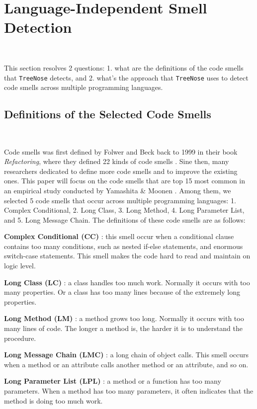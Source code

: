 \section{Language-Independent Smell Detection}~\label{sec:approach}

This section resolves 2 questions: 1. what are the definitions of the code
smells that \texttt{TreeNose} detects, and 2. what's the approach that
\texttt{TreeNose} uses to detect code smells across multiple programming
languages.

\subsection{Definitions of the Selected Code Smells}~\label{sec:definitions}

Code smells was first defined by Folwer and Beck back to 1999 in their book \textit{Refactoring},
where they defined 22 kinds of code smells \cite{Fowler_Beck}. Sine then, many researchers dedicated to define more
code smells and to improve the existing ones. This paper will focus on the code smells that are top 15 most common in
an empirical study conducted by Yamashita \& Moonen \cite{developersCare}.
Among them, we selected 5 code smells that occur across multiple programming languages: 1. Complex Conditional, 2. Long Class,
3. Long Method, 4. Long Parameter List, and 5. Long Message Chain. The definitions of these code smells are as follows:

\textbf{Complex Conditional (CC)} \cite{Fowler_Beck}: this smell occur when a conditional clause contains too many conditions,
such as nested if-else statements, and enormous switch-case statements. This smell makes the code hard to read and maintain on logic level.

\textbf{Long Class (LC)} \cite{Fowler_Beck}: a class handles too much work. Normally it occurs with too many properties. Or a class has too many lines because of
the extremely long properties.

\textbf{Long Method (LM)} \cite{Fowler_Beck}: a method grows too long. Normally it occurs with too many lines of code. The longer a method is, the harder it is to understand the procedure.

\textbf{Long Message Chain (LMC)} \cite{Fowler_Beck}: a long chain of object calls. This smell occurs when a method or an attribute calls another method or an attribute, and so on.

\textbf{Long Parameter List (LPL)} \cite{Fowler_Beck}: a method or a function has too many parameters. When a method has too many parameters, it often indicates that the method is doing too much work.

